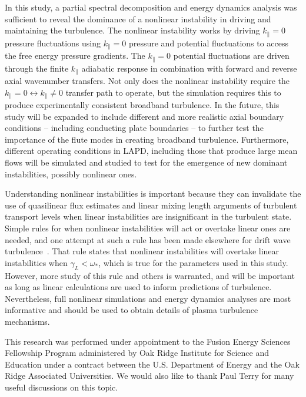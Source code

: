 \documentclass[showpacs,preprintnumbers,amsmath,amssymb,superscriptaddress]{revtex4}
\begin{document}
In this study, a partial spectral decomposition and energy dynamics analysis was sufficient to reveal the dominance of a nonlinear instability in driving and maintaining the turbulence.
The nonlinear instability works by driving $k_\parallel = 0$ pressure fluctuations using $k_\parallel = 0$ pressure and potential fluctuations to access the free energy pressure gradients.
The $k_\parallel = 0$ potential fluctuations are driven through the finite $k_\parallel$ adiabatic response in combination with forward and reverse axial wavenumber transfers. Not only
does the nonlinear instability require the $k_\parallel = 0 \leftrightarrow k_\parallel \ne 0$ transfer path to operate, but the simulation requires this to produce experimentally
consistent broadband turbulence. In the future, this study will be expanded to include different and more realistic axial boundary conditions -- including conducting plate boundaries --
to further test the importance of the flute modes in creating broadband turbulence. Furthermore, different operating conditions in LAPD, including those that produce large mean flows
will be simulated and studied to test for the emergence of new dominant instabilities, possibly nonlinear ones.
 
Understanding nonlinear instabilities is important because they can invalidate the use of quasilinear flux estimates and linear mixing length arguments of turbulent transport 
levels when linear instabilities are insignificant in the turbulent state. Simple rules for when nonlinear instabilities will act or overtake linear ones are needed, and one attempt at such
a rule has been made elsewhere for drift wave turbulence~\cite{scott2005}. That rule states that nonlinear instabilities will overtake linear instabilities when $\gamma_L < \omega_*$, which is true
for the parameters used in this study. However, more study of this rule and others is warranted, and will be important as long as linear calculations are used to inform predictions of turbulence.
Nevertheless, full nonlinear simulations and energy dynamics analyses
are most informative and should be used to obtain details of plasma
turbulence mechanisms.


\begin{acknowledgments}
This research was performed under appointment to the Fusion Energy Sciences Fellowship Program administered by Oak Ridge Institute for
Science and Education under a contract between the U.S. Department of Energy and the Oak Ridge Associated Universities. We would also like to thank Paul Terry for many
useful discussions on this topic.
\end{acknowledgments}
\end{document}

